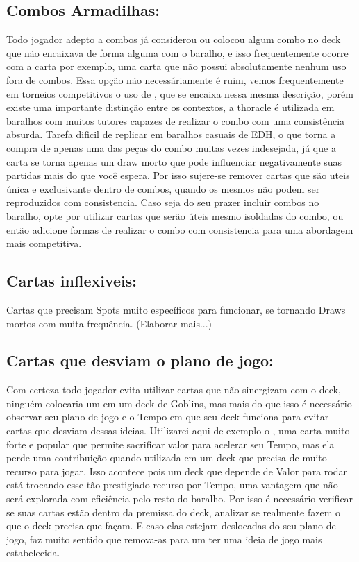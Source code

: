 \subsection{Combos Armadilhas:}
Todo jogador adepto a combos já considerou ou colocou algum combo no deck que não encaixava de forma alguma com o baralho, e isso frequentemente ocorre com a carta  por exemplo, uma carta que não possui absolutamente nenhum uso fora de combos.
Essa opção não necessáriamente é ruim, vemos frequentemente em torneios competitivos o uso de , que se encaixa nessa mesma descrição, porém existe uma importante distinção entre os contextos, a thoracle é utilizada em baralhos com muitos tutores capazes de realizar o combo com uma consistência absurda.
Tarefa dificil de replicar em baralhos casuais de EDH, o que torna a compra de apenas uma das peças do combo muitas vezes indesejada, já que a carta se torna apenas um draw morto que pode influenciar negativamente suas partidas mais do que você espera.
Por isso sujere-se remover cartas que são uteis única e exclusivante dentro de combos, quando os mesmos não podem ser reproduzidos com consistencia.
Caso seja do seu prazer incluir combos no baralho, opte por utilizar cartas que serão úteis mesmo isoldadas do combo, ou então adicione formas de realizar o combo com consistencia para uma abordagem mais competitiva.


\subsection{Cartas inflexiveis:}
Cartas que precisam Spots muito específicos para funcionar, se tornando Draws mortos com muita frequência. (Elaborar mais...)

\subsection{Cartas que desviam o plano de jogo:}
Com certeza todo jogador evita utilizar cartas que não sinergizam com o deck, ninguém colocaria um  em um deck de Goblins, mas mais do que isso é necessário observar seu plano de jogo e o Tempo em que seu deck funciona para evitar cartas que desviam dessas ideias.
Utilizarei aqui de exemplo o , uma carta muito forte e popular que permite sacrificar valor para acelerar seu Tempo, mas ela perde uma contribuição quando utilizada em um deck que precisa de muito recurso para jogar.
Isso acontece pois um deck que depende de Valor para rodar está trocando esse tão prestigiado recurso por Tempo, uma vantagem que não será explorada com eficiência pelo resto do baralho. Por isso é necessário verificar se suas cartas estão dentro da premissa do deck, analizar se realmente fazem o que o deck precisa que façam.
E caso elas estejam deslocadas do seu plano de jogo, faz muito sentido que remova-as para um ter uma ideia de jogo mais estabelecida.


